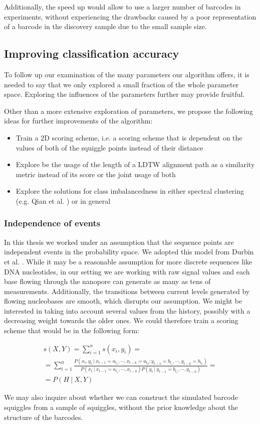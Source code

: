 Additionally, the speed up would allow to use a larger number of barcodes in experiments, without experiencing the drawbacks caused by a poor representation of a barcode in the discovery sample due to the small sample size.

\subsection*{Improving classification accuracy}
To follow up our examination of the many parameters our algorithm offers, it is needed to say that we only explored a small fraction of the whole parameter space. Exploring the influences of the parameters further may provide fruitful.

Other than a more extensive exploration of parameters, we propose the following ideas for further improvements of the algorithm:

\begin{itemize}
    \item Train a $2$D scoring scheme, i.e. a scoring scheme that is dependent on the values of both of the squiggle points instead of their distance
    \item Explore be the usage of the length of a LDTW alignment path as a similarity metric instead of its score or the joint usage of both
    \item Explore the solutions for class imbalancedness in either spectral clustering (e.g. Qian et al. \cite{qian2013spectral}) or in general
\end{itemize}


\subsubsection*{Independence of events}
In this thesis we worked under an assumption that the sequence points are independent events in the probability space. We adopted this model from Durbin et al. \cite{Durbin1998}. While it may be a reasonable assumption for more discrete sequences like DNA nucleotides, in our setting we are working with raw signal values and each base flowing through the nanopore can generate as many as tens of measurements. Additionally, the transitions between current levels generated by flowing nucleobases are smooth, which disrupts our assumption. We might be interested in taking into account several values from the history, possibly with a decreasing weight towards the older ones. We could therefore train a scoring scheme that would be in the following form:

\begin{multline}
    s(X, Y) = \sum_{i=1}^n s(x_i, y_i) = \\
      = \sum_{t=1}^n \frac{P(x_t, y_t ~|~ x_{t-1} = a_{t_1},\cdots,x_{t-k} = a_{t_k}; y_{t-1} = b_{t_1},\cdots,y_{t-k} = b_{t_k})}{P(x_t ~|~ x_{t-1} = a_{t_1},\cdots,x_{t-k})P(y_t ~|~ y_{t-1} = b_{t_1},\cdots,y_{t-k})} =\\
      = P(H ~|~ X, Y)
\end{multline}

We may also inquire about whether we can construct the simulated barcode squiggles from a sample of squiggles, without the prior knowledge about the structure of the barcodes.

